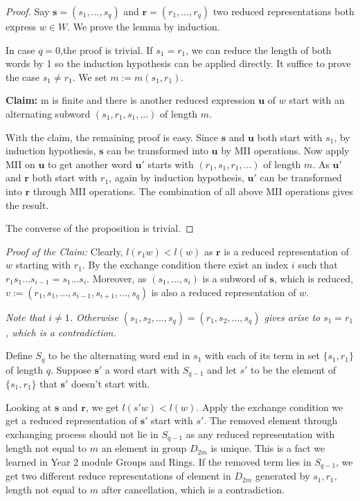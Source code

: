 \begin{proof}
    Say $\mathbf{s}=(s_1,...,s_q)$ and $\mathbf{r}=(r_1,...,r_q)$ two reduced representations both express $w \in W$. We prove the lemma by induction. 

In case $q=0$,the proof is trivial. If $s_1=r_1$, we can reduce the length of both words by 1 so the induction hypothesis can be applied directly. It suffice to prove the case $s_1 \ne r_1$. We set $m:=m(s_1,r_1)$.

\vspace{0.5\baselineskip}
\noindent \textbf{Claim:} m is finite and there is another reduced expression $\mathbf{u}$ of $w$ start with an alternating subword $(s_1,r_1,s_1,...)$ of length $m$.

\vspace{0.5\baselineskip}
With the claim, the remaining proof is easy. Since $\mathbf{s}$ and $\mathbf{u}$ both start with $s_1$, by induction hypothesis, $\mathbf{s}$ can be transformed into $\mathbf{u}$ by MII operations. Now apply MII on $\mathbf{u}$ to get another word $\mathbf{u'}$ starts with $(r_1,s_1,r_1,...)$ of length $m$. As $\mathbf{u'}$ and $\mathbf{r}$ both start with $r_1$, again by induction hypothesis, $\mathbf{u'}$ can be transformed into $\mathbf{r}$ through MII operations. The combination of all above MII operations gives the result. 

The converse of the proposition is trivial.
\end{proof} 

\vspace{\baselineskip}
\noindent \textit{Proof of the Claim:} Clearly, $l(r_1w) < l(w)$ as $\mathbf{r}$ is a reduced representation of $w$ starting with $r_1$. By the exchange condition there exist an index $i$ such that $r_1s_1...s_{i-1}=s_1...s_i$. Moreover, as $(s_1,...,s_i)$ is a subword of $\mathbf{s}$, which is reduced, $v:=(r_1,s_1,...,s_{i-1},s_{i+1},...,s_q)$ is also a reduced representation of $w$. 

\textit{Note that $i \ne 1$. Otherwise $(s_1,s_2,...,s_q)=(r_1,s_2,...,s_q)$ gives arise to $s_1=r_1$, which is a contradiction. }

Define $S_q$ to be the alternating word end in $s_1$ with each of its term in set $\{s_1,r_1\}$ of length $q$. Suppose $\mathbf{s'}$ a word start with $S_{q-1}$ and let $s'$ to be the element of $\{s_1,r_1\}$ that $\mathbf{s'}$ doesn't start with. 

Looking at $\mathbf{s}$ and $\mathbf{r}$, we get $l(s'w)<l(w)$. Apply the exchange condition we get a reduced representation of $\mathbf{s'}$ start with $s'$. The removed element through exchanging process should not lie in $S_{q-1}$ as any reduced representation with length not equal to $m$ an element in group $D_{2m}$ is unique. This is a fact we learned in Year 2 module Groups and Rings. If the removed term lies in $S_{q-1}$, we get two different reduce representations of element in $D_{2m}$ generated by $s_1,r_1$, length not equal to $m$ after cancellation, which is a contradiction. 

